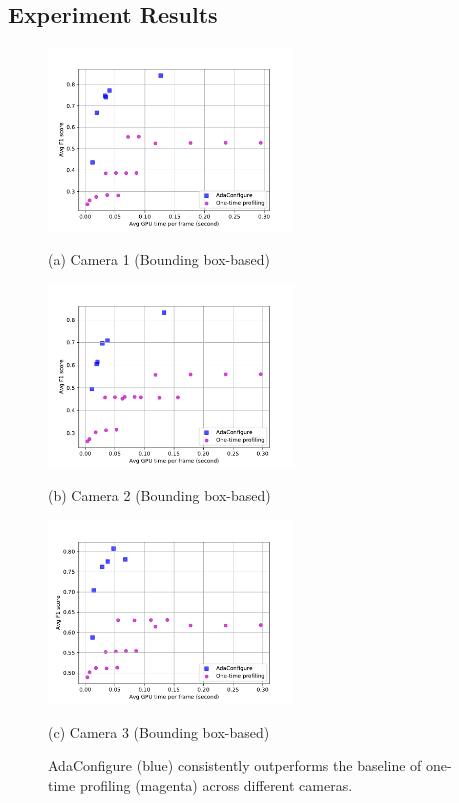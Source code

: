 \subsection{Experiment Results}
\begin{figure}[!t]
	\begin{minipage}[t]{0.32\linewidth}
		\centerline{\includegraphics[width=6.5cm]{figures/Westbound.pdf}}
		\centerline{(a) Camera 1 (Bounding box-based)}
	\end{minipage}
	\hfill
	\begin{minipage}[t]{0.32\linewidth}
		\centerline{\includegraphics[width=6.5cm]{figures/Eastbound.pdf}}
		\centerline{(b) Camera 2 (Bounding box-based)}
	\end{minipage}
	\hfill
	\begin{minipage}[t]{0.32\linewidth}
		\centerline{\includegraphics[width=6.5cm]{figures/Rear.pdf}}
		\centerline{(c) Camera 3 (Bounding box-based)}
	\end{minipage}		
	\caption{AdaConfigure (blue) consistently outperforms the baseline of one-time profiling (magenta) across different cameras.}
	\label{fig: 3dataset results}
\end{figure}

